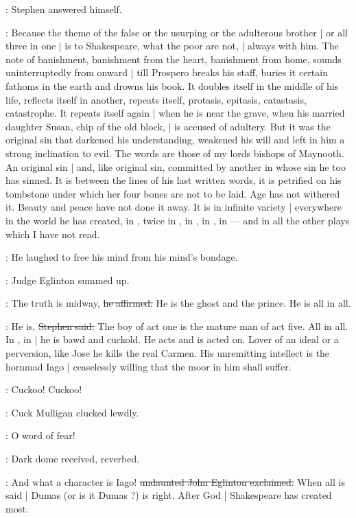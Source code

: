 :
Stephen answered himself.

\Stephen:
Because the theme of the false
or the usurping
or the adulterous brother |
or all three in one |
is to Shakespeare,
what the poor are not, |
always with him.
The note of banishment,
banishment from the heart,
banishment from home,
sounds uninterruptedly from  onward |
till Prospero breaks his staff,
buries it certain fathoms in the earth and drowns his book.
It doubles itself in the middle of his life,
reflects itself in another,
repeats itself,
protasis,
epitasis,
catastasis,
catastrophe.
It repeats itself again |
when he is near the grave,
when his married daughter Susan,
chip of the old block, |
is accused of adultery.
But it was the original sin that darkened his understanding,
weakened his will and left in him a strong inclination to evil.
The words are those of my lords bishops of Maynooth.
An original sin |
and, like original sin,
committed by another in whose sin he too has sinned.
It is between the lines of his last written words,
it is petrified on his tombstone
under which her four bones are not to be laid.
Age has not withered it.
Beauty and peace have not done it away.
It is in infinite variety |
everywhere in the world he has created,
in ,
twice in ,
in ,
in ,
in  ---
and in all the other plays which I have not read.

:
He laughed to free his mind from his mind's bondage.

:
Judge Eglinton summed up.

\eglinton:
The truth is midway,
\sout{he affirmed.}
He is the ghost and the prince.
He is all in all.

\Stephen:
He is,
\sout{Stephen said.}
The boy of act one is the mature man of act five.
All in all.
In , in  |
he is bawd and cuckold.
He acts and is acted on.
Lover of an ideal or a perversion,
like Jose he kills the real Carmen.
His unremitting intellect is the hornmad Iago |
ceaselessly willing that the moor in him shall suffer.

\mulligan:
Cuckoo! Cuckoo!

:
Cuck Mulligan clucked lewdly.

\mulligan:
O word of fear!

\StephenInt:
Dark dome received,
reverbed.

\eglinton:
And what a character is Iago!
\sout{undaunted John Eglinton exclaimed.}
When all is said |
Dumas  (or is it Dumas ?) is right.
After God |
Shakespeare has created most.

